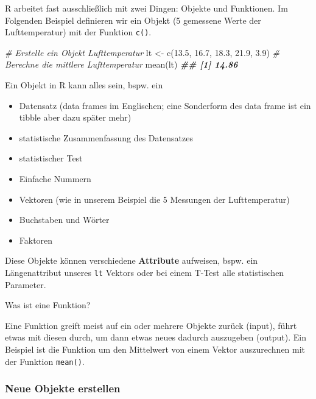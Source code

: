 \documentclass[
]{article}
\newenvironment{Shaded}{\begin{snugshade}}{\end{snugshade}}
\newcommand{\CommentTok}[1]{\textcolor[rgb]{0.56,0.35,0.01}{\textit{#1}}}
\newcommand{\DocumentationTok}[1]{\textcolor[rgb]{0.56,0.35,0.01}{\textbf{\textit{#1}}}}
\newcommand{\FloatTok}[1]{\textcolor[rgb]{0.00,0.00,0.81}{#1}}
\newcommand{\FunctionTok}[1]{\textcolor[rgb]{0.00,0.00,0.00}{#1}}
\newcommand{\NormalTok}[1]{#1}
\newcommand{\OtherTok}[1]{\textcolor[rgb]{0.56,0.35,0.01}{#1}}
\providecommand{\tightlist}{%
  \setlength{\itemsep}{0pt}\setlength{\parskip}{0pt}}
\begin{document}
R arbeitet fast ausschließlich mit zwei Dingen: Objekte und Funktionen. Im Folgenden Beispiel definieren wir ein Objekt (5 gemessene Werte der Lufttemperatur) mit der Funktion \texttt{c()}.

\begin{Shaded}
\begin{Highlighting}[]
\CommentTok{\# Erstelle ein Objekt Lufttemperatur}
\NormalTok{lt }\OtherTok{\textless{}{-}} \FunctionTok{c}\NormalTok{(}\FloatTok{13.5}\NormalTok{, }\FloatTok{16.7}\NormalTok{, }\FloatTok{18.3}\NormalTok{, }\FloatTok{21.9}\NormalTok{, }\FloatTok{3.9}\NormalTok{)}
\CommentTok{\# Berechne die mittlere Lufttemperatur }
\FunctionTok{mean}\NormalTok{(lt)}
\DocumentationTok{\#\# [1] 14.86}
\end{Highlighting}
\end{Shaded}

Ein Objekt in R kann alles sein, bspw. ein

\begin{itemize}
\tightlist
\item
  Datensatz (data frames im Englischen; eine Sonderform des data frame ist ein tibble aber dazu später mehr)
\item
  statistische Zusammenfassung des Datensatzes
\item
  statistischer Test
\item
  Einfache Nummern
\item
  Vektoren (wie in unserem Beispiel die 5 Messungen der Lufttemperatur)
\item
  Buchstaben und Wörter
\item
  Faktoren
\end{itemize}

Diese Objekte können verschiedene \textbf{Attribute} aufweisen, bspw. ein Längenattribut unseres \texttt{lt} Vektors oder bei einem T-Test alle statistischen Parameter.

Was ist eine Funktion?

Eine Funktion greift meist auf ein oder mehrere Objekte zurück (input), führt etwas mit diesen durch, um dann etwas neues dadurch auszugeben (output). Ein Beispiel ist die Funktion um den Mittelwert von einem Vektor auszurechnen mit der Funktion \texttt{mean()}.

\hypertarget{neue-objekte-erstellen}{%
\subsubsection{Neue Objekte erstellen}\label{neue-objekte-erstellen}}
\end{document}
